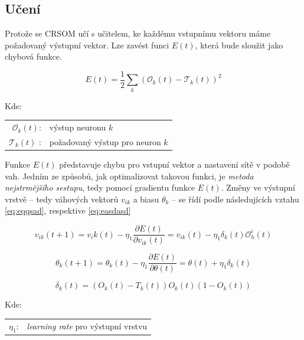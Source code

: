 \documentclass[thesis=M,czech]{FITthesis}[2012/06/26]
\begin{document}
\subsection{Učení}
Protože se CRSOM učí s učitelem, ke každému vstupnímu vektoru máme požadovaný výstupní vektor. Lze zavést funci $E(t)$, která bude sloužit jako chybová funkce.

\vspace{\baselineskip}
\noindent
\begin{minipage}[c]{\textwidth }

\begin{equation} \label{eq:e}
   E(t)=\frac{1}{2}\sum\limits_k{(\mathcal{O}_k(t)-\mathcal{T}_k(t))^2}  
\end{equation}


Kde:\\
\hspace*{3em}
\begin{tabular}{rl}
    $\mathcal{O}_k(t)$:& výstup neuronu $k$ \\
    $\mathcal{T}_k(t) $ :& požadovaný výstup pro neuron $k$ \\

\end{tabular}
\end{minipage} 
\vspace{\baselineskip}
\noindent


Funkce $E(t)$ představuje chybu pro vstupní vektor a nastavení sítě v podobě vah. Jedním ze způsobů, jak optimalizovat takovou funkci, je \textit{metoda nejstrmějšího sestupu}, tedy pomocí gradientu funkce $E(t)$. Změny ve výstupní vrstvě -- tedy váhových vektorů $v_{ik}$ a biasu $ \theta_k$ -- se řídí podle následujících vztahu \ref{eq:eqqsad}, respektive \ref{eq:easdasd}

\vspace{\baselineskip}
\noindent
\begin{minipage}[c]{\textwidth }

\begin{equation}\label{eq:eqqsad}
   v_{ik}(t+1)=v_ik(t) - \eta_1\frac{\partial{E(t)}}{\partial{v_{ik}(t)}} =  v_{ik}(t) - \eta_1\delta_k(t)\mathcal{O}_h^i(t) 
\end{equation}

\begin{equation}\label{eq:easdasd}
   \theta_k(t+1)=\theta_k(t) - \eta_1\frac{\partial{E(t)}}{\partial{\theta(t)}} = \theta(t)  + \eta_1\delta_k(t)
\end{equation}

\begin{equation*}
   \delta_k(t) = (O_k(t) - T_k(t))O_k(t)(1-O_k(t)) 
\end{equation*}

Kde:\\
\hspace*{3em}
\begin{tabular}{rl}
    $\eta_1$:& \textit{learning rate} pro výstupní vrstvu \\
\end{tabular}
\end{minipage} 
\vspace{\baselineskip}
\noindent
\end{document}

